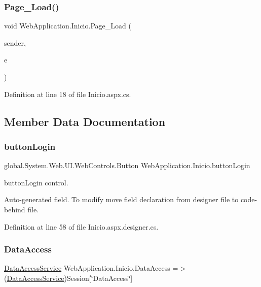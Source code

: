 \subsubsection{\texorpdfstring{Page\_Load()}{Page\_Load()}}
{\footnotesize\ttfamily void Web\+Application.\+Inicio.\+Page\+\_\+\+Load (\begin{DoxyParamCaption}\item[{object}]{sender,  }\item[{Event\+Args}]{e }\end{DoxyParamCaption})\hspace{0.3cm}{\ttfamily [protected]}}



Definition at line 18 of file Inicio.\+aspx.\+cs.



\subsection{Member Data Documentation}
\mbox{\label{classWebApplication_1_1Inicio_a3a35697eb44344439551b307b06fd36b}} 
\subsubsection{\texorpdfstring{buttonLogin}{buttonLogin}}
{\footnotesize\ttfamily global.\+System.\+Web.\+U\+I.\+Web\+Controls.\+Button Web\+Application.\+Inicio.\+button\+Login\hspace{0.3cm}{\ttfamily [protected]}}



button\+Login control. 

Auto-\/generated field. To modify move field declaration from designer file to code-\/behind file. 

Definition at line 58 of file Inicio.\+aspx.\+designer.\+cs.

\mbox{\label{classWebApplication_1_1Inicio_af08ee9b91d0d180dfe4778c6da094365}} 
\subsubsection{\texorpdfstring{DataAccess}{DataAccess}}
{\footnotesize\ttfamily \mbox{\hyperlink{classDataBaseAccess_1_1DataAccessService}{Data\+Access\+Service}} Web\+Application.\+Inicio.\+Data\+Access =$>$ (\mbox{\hyperlink{classDataBaseAccess_1_1DataAccessService}{Data\+Access\+Service}})Session\mbox{[}\char`\"{}Data\+Access\char`\"{}\mbox{]}\hspace{0.3cm}{\ttfamily [private]}}



